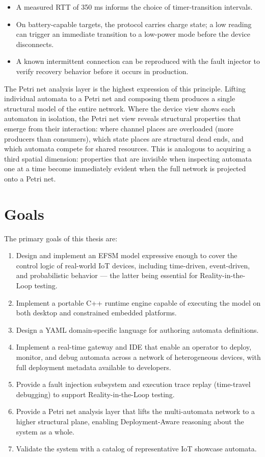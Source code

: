 \begin{itemize}
  \item A measured RTT of 350 ms informs the choice of timer-transition intervals.
  \item On battery-capable targets, the protocol carries charge state; a low reading can trigger an immediate transition to a low-power mode before the device disconnects.
  \item A known intermittent connection can be reproduced with the fault injector to verify recovery behavior before it occurs in production.
\end{itemize}

The Petri net analysis layer is the highest expression of this principle. Lifting individual automata to a Petri net and composing them produces a single structural model of the entire network. Where the device view shows each automaton in isolation, the Petri net view reveals structural properties that emerge from their interaction: where channel places are overloaded (more producers than consumers), which state places are structural dead ends, and which automata compete for shared resources. This is analogous to acquiring a third spatial dimension: properties that are invisible when inspecting automata one at a time become immediately evident when the full network is projected onto a Petri net.

\section{Goals}

The primary goals of this thesis are:

\begin{enumerate}
  \item Design and implement an EFSM model expressive enough to cover the control logic of real-world IoT devices, including time-driven, event-driven, and probabilistic behavior --- the latter being essential for Reality-in-the-Loop testing.
  \item Implement a portable C++ runtime engine capable of executing the model on both desktop and constrained embedded platforms.
  \item Design a YAML domain-specific language for authoring automata definitions.
  \item Implement a real-time gateway and IDE that enable an operator to deploy, monitor, and debug automata across a network of heterogeneous devices, with full deployment metadata available to developers.
  \item Provide a fault injection subsystem and execution trace replay (time-travel debugging) to support Reality-in-the-Loop testing.
  \item Provide a Petri net analysis layer that lifts the multi-automata network to a higher structural plane, enabling Deployment-Aware reasoning about the system as a whole.
  \item Validate the system with a catalog of representative IoT showcase automata.
\end{enumerate}

